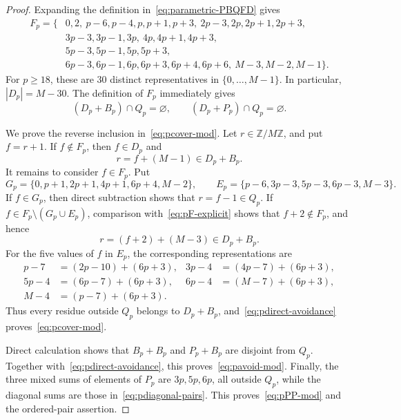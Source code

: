 \documentclass[11pt,letterpaper]{article}
\newcommand{\ZM}{\mathbb{Z}/M\mathbb{Z}}
\begin{document}
\begin{proof}
Expanding the definition in~\eqref{eq:parametric-PBQFD} gives
\begin{equation}\label{eq:pF-explicit}
\begin{split}
F_p=\{&0,2,\ p-6,p-4,p,p+1,p+3,\ 2p-3,2p,2p+1,2p+3,\\
&3p-3,3p-1,3p,\ 4p,4p+1,4p+3,\\
&5p-3,5p-1,5p,5p+3,\\
&6p-3,6p-1,6p,6p+3,6p+4,6p+6,\ M-3,M-2,M-1\}.
\end{split}
\end{equation}
For \(p\geq18\), these are \(30\) distinct representatives in \(\{0,\ldots,M-1\}\). In particular, \(|D_p|=M-30\). The definition of \(F_p\) immediately gives
\begin{equation}\label{eq:pdirect-avoidance}
(D_p+B_p)\cap Q_p=\varnothing,
\qquad
(D_p+P_p)\cap Q_p=\varnothing.
\end{equation}

We prove the reverse inclusion in~\eqref{eq:pcover-mod}. Let \(r\in\ZM\), and put \(f=r+1\). If \(f\notin F_p\), then \(f\in D_p\) and
\[
r=f+(M-1)\in D_p+B_p.
\]
It remains to consider \(f\in F_p\). Put
\[
G_p=\{0,p+1,2p+1,4p+1,6p+4,M-2\},
\qquad
E_p=\{p-6,3p-3,5p-3,6p-3,M-3\}.
\]
If \(f\in G_p\), then direct subtraction shows that \(r=f-1\in Q_p\). If \(f\in F_p\setminus(G_p\cup E_p)\), comparison with~\eqref{eq:pF-explicit} shows that \(f+2\notin F_p\), and hence
\[
r=(f+2)+(M-3)\in D_p+B_p.
\]
For the five values of \(f\) in \(E_p\), the corresponding representations are
\begin{align*}
p-7&=(2p-10)+(6p+3),&
3p-4&=(4p-7)+(6p+3),\\
5p-4&=(6p-7)+(6p+3),&
6p-4&=(M-7)+(6p+3),\\
M-4&=(p-7)+(6p+3).
\end{align*}
Thus every residue outside \(Q_p\) belongs to \(D_p+B_p\), and~\eqref{eq:pdirect-avoidance} proves~\eqref{eq:pcover-mod}.

Direct calculation shows that \(B_p+B_p\) and \(P_p+B_p\) are disjoint from \(Q_p\). Together with~\eqref{eq:pdirect-avoidance}, this proves~\eqref{eq:pavoid-mod}. Finally, the three mixed sums of elements of \(P_p\) are \(3p,5p,6p\), all outside \(Q_p\), while the diagonal sums are those in~\eqref{eq:pdiagonal-pairs}. This proves~\eqref{eq:pPP-mod} and the ordered-pair assertion.
\end{proof}
\end{document}
